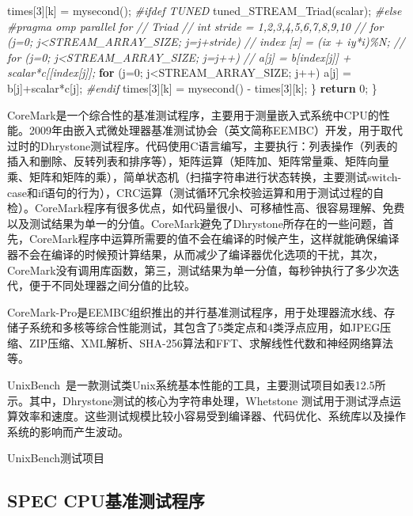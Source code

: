 \documentclass[]{ctexbook}
\newenvironment{Shaded}{\begin{snugshade}}{\end{snugshade}}
\newcommand{\CommentTok}[1]{\textcolor[rgb]{0.56,0.35,0.01}{\textit{#1}}}
\newcommand{\ControlFlowTok}[1]{\textcolor[rgb]{0.13,0.29,0.53}{\textbf{#1}}}
\newcommand{\DecValTok}[1]{\textcolor[rgb]{0.00,0.00,0.81}{#1}}
\newcommand{\NormalTok}[1]{#1}
\newcommand{\PreprocessorTok}[1]{\textcolor[rgb]{0.56,0.35,0.01}{\textit{#1}}}
\begin{document}
\begin{Shaded}
\begin{Highlighting}[]
\NormalTok{    times[}\DecValTok{3}\NormalTok{][k] = mysecond();}
\PreprocessorTok{\#ifdef TUNED}
\NormalTok{        tuned\_STREAM\_Triad(scalar);}
\PreprocessorTok{\#else}
\PreprocessorTok{\#pragma omp parallel for}
\CommentTok{// Triad        }
\CommentTok{//  int stride = 1,2,3,4,5,6,7,8,9,10}
\CommentTok{//    for (j=0; j\textless{}STREAM\_ARRAY\_SIZE; j=j+stride)}
\CommentTok{//    index [x] = (ix + iy*i)\%N;}
\CommentTok{//    for (j=0; j\textless{}STREAM\_ARRAY\_SIZE; j=j++)}
\CommentTok{//    a[j] = b[index[j]] + scalar*c[[index[j]];}
    \ControlFlowTok{for}\NormalTok{ (j=}\DecValTok{0}\NormalTok{; j\textless{}STREAM\_ARRAY\_SIZE; j++)}
\NormalTok{        a[j] = b[j]+scalar*c[j];}
\PreprocessorTok{\#endif}
\NormalTok{    times[}\DecValTok{3}\NormalTok{][k] = mysecond() {-} times[}\DecValTok{3}\NormalTok{][k];}
\NormalTok{    \}}
    \ControlFlowTok{return} \DecValTok{0}\NormalTok{;}
\NormalTok{\}}
\end{Highlighting}
\end{Shaded}

CoreMark是一个综合性的基准测试程序，主要用于测量嵌入式系统中CPU的性能。2009年由嵌入式微处理器基准测试协会（英文简称EEMBC）开发，用于取代过时的Dhrystone测试程序。代码使用C语言编写，主要执行：列表操作（列表的插入和删除、反转列表和排序等），矩阵运算（矩阵加、矩阵常量乘、矩阵向量乘、矩阵和矩阵的乘），简单状态机（扫描字符串进行状态转换，主要测试switch-case和if语句的行为），CRC运算（测试循环冗余校验运算和用于测试过程的自检）。CoreMark程序有很多优点，如代码量很小、可移植性高、很容易理解、免费以及测试结果为单一的分值。CoreMark避免了Dhrystone所存在的一些问题，首先，CoreMark程序中运算所需要的值不会在编译的时候产生，这样就能确保编译器不会在编译的时候预计算结果，从而减少了编译器优化选项的干扰，其次，CoreMark没有调用库函数，第三，测试结果为单一分值，每秒钟执行了多少次迭代，便于不同处理器之间分值的比较。

CoreMark-Pro是EEMBC组织推出的并行基准测试程序，用于处理器流水线、存储子系统和多核等综合性能测试，其包含了5类定点和4类浮点应用，如JPEG压缩、ZIP压缩、XML解析、SHA-256算法和FFT、求解线性代数和神经网络算法等。

UnixBench~是一款测试类Unix系统基本性能的工具，主要测试项目如表12.5所示。其中，Dhrystone测试的核心为字符串处理，Whetstone 测试用于测试浮点运算效率和速度。这些测试规模比较小容易受到编译器、代码优化、系统库以及操作系统的影响而产生波动。

\label{tab:UnixBench}UnixBench测试项目

\hypertarget{spec-cpuux57faux51c6ux6d4bux8bd5ux7a0bux5e8f}{%
\subsection{SPEC CPU基准测试程序}\label{spec-cpuux57faux51c6ux6d4bux8bd5ux7a0bux5e8f}}
\end{document}
